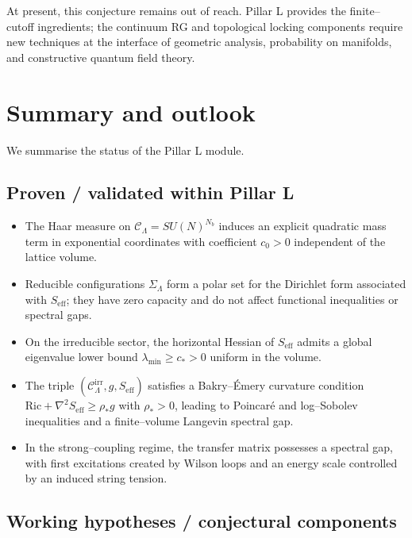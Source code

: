 \documentclass[11pt]{article}
\numberwithin{equation}{section}
\begin{document}
At present, this conjecture remains out of reach.  Pillar L provides the
finite--cutoff ingredients; the continuum RG and topological locking
components require new techniques at the interface of geometric analysis,
probability on manifolds, and constructive quantum field theory.

\section{Summary and outlook}

We summarise the status of the Pillar L module.

\subsection*{Proven / validated within Pillar L}

\begin{itemize}
  \item The Haar measure on $\mathcal{C}_\Lambda = SU(N)^{N_b}$ induces
  an explicit quadratic mass term in exponential coordinates with
  coefficient $c_0>0$ independent of the lattice volume.

  \item Reducible configurations $\Sigma_\Lambda$ form a polar set for
  the Dirichlet form associated with $S_{\mathrm{eff}}$; they have zero
  capacity and do not affect functional inequalities or spectral gaps.

  \item On the irreducible sector, the horizontal Hessian of
  $S_{\mathrm{eff}}$ admits a global eigenvalue lower bound
  $\lambda_{\min}\ge c_*>0$ uniform in the volume.

  \item The triple $(\mathcal{C}_\Lambda^{\mathrm{irr}},g,S_{\mathrm{eff}})$
  satisfies a Bakry--\'Emery curvature condition
  $\mathrm{Ric}+\nabla^2 S_{\mathrm{eff}}\ge\rho_* g$ with
  $\rho_*>0$, leading to Poincar\'e and log--Sobolev inequalities and a
  finite--volume Langevin spectral gap.

  \item In the strong--coupling regime, the transfer matrix possesses a
  spectral gap, with first excitations created by Wilson loops and an
  energy scale controlled by an induced string tension.
\end{itemize}

\subsection*{Working hypotheses / conjectural components}
\end{document}
